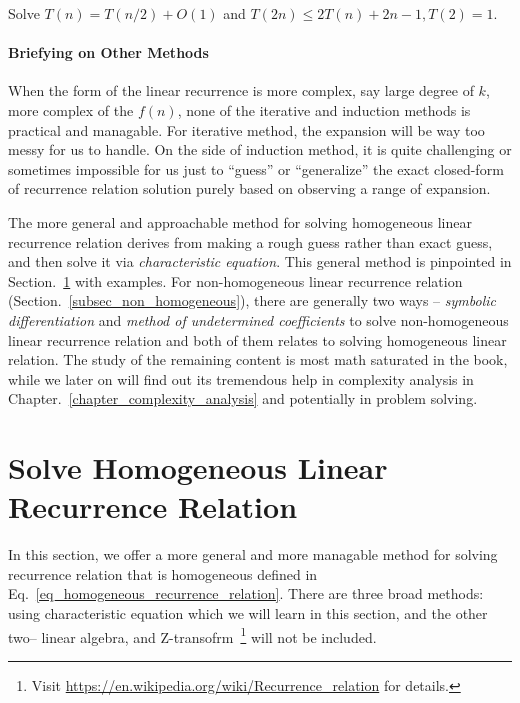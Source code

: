 \documentclass[../main.tex]{subfiles}
\begin{document}
\begin{bclogo}[couleur = blue!30, arrondi=0.1,logo=\bccrayon,ombre=true]{Solve $T(n)=T(n/2)+O(1)$ and $T(2n)\leq2T(n)+2n-1, T(2)=1$.}
\end{bclogo}


\paragraph{Briefying on Other Methods}
When the form of the linear recurrence is more complex, say large degree of $k$, more complex of the $f(n)$, none of the iterative and induction methods is practical and managable. For iterative method, the expansion will be way too messy for us to handle. On the side of induction method, it is quite challenging or sometimes impossible for us just to ``guess'' or ``generalize'' the exact closed-form of recurrence relation solution purely based on observing a range of expansion.   

The more general and approachable method  for solving homogeneous linear recurrence relation derives from making a rough guess rather than exact guess, and then solve it via \textit{characteristic equation}. This general method is pinpointed in Section.~\ref{subsec_homogeneous_linear_recurrence} with examples. For non-homogeneous linear recurrence relation (Section.~\ref{subsec_non_homogeneous}), there are generally two ways -- \textit{symbolic differentiation} and \textit{method of undetermined coefficients} to solve non-homogeneous linear recurrence relation and both of them relates to solving homogeneous linear relation. The study of the remaining content is most math saturated in the book, while we later on will find out its tremendous help in complexity analysis in Chapter.~\ref{chapter_complexity_analysis} and potentially in problem solving. 


\section{Solve Homogeneous Linear Recurrence Relation}

\label{subsec_homogeneous_linear_recurrence} 
In this section, we offer a more general and more managable method for solving recurrence relation that is homogeneous defined in Eq.~\ref{eq_homogeneous_recurrence_relation}. There are three broad methods: using characteristic equation which we will learn  in this section, and the other two-- {linear algebra, and Z-transofrm}~\footnote{Visit \url{https://en.wikipedia.org/wiki/Recurrence_relation} for details.} will not be included. 
\end{document}
